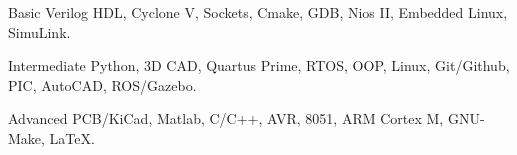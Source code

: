 

\begin{cvskills}

  \cvskill
    {Basic} %
    {Verilog HDL, Cyclone V, Sockets, Cmake, GDB, Nios II, Embedded Linux, SimuLink.} %

  \cvskill
    {Intermediate} %
    {Python, 3D CAD, Quartus Prime, RTOS, OOP, Linux, Git/Github, PIC, AutoCAD, ROS/Gazebo.} %

  \cvskill
    {Advanced} %
    {PCB/KiCad, Matlab, C/C++, AVR, 8051, ARM Cortex M, GNU-Make, LaTeX.} %

\end{cvskills}




